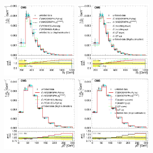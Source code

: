 \begin{figure}[hbtp]
     \includegraphics[width=0.33\textwidth]{Chapters/04_Analysis/04b_XSections/images/results/fit/7TeV/ST/central/normalised_xsection_combined_different_generators_with_bkgd_subtraction_results.pdf}\hfill
     \includegraphics[width=0.33\textwidth]{Chapters/04_Analysis/04b_XSections/images/results/fit/7TeV/ST/central/normalised_xsection_combined_systematics_shifts_with_bkgd_subtraction_results.pdf}\\
     \includegraphics[width=0.33\textwidth]{Chapters/04_Analysis/04b_XSections/images/results/fit/7TeV/WPT/central/normalised_xsection_combined_different_generators_with_bkgd_subtraction_results.pdf}\hfill
     \includegraphics[width=0.33\textwidth]{Chapters/04_Analysis/04b_XSections/images/results/fit/7TeV/WPT/central/normalised_xsection_combined_systematics_shifts_with_bkgd_subtraction_results.pdf}\hfill

\end{figure}
